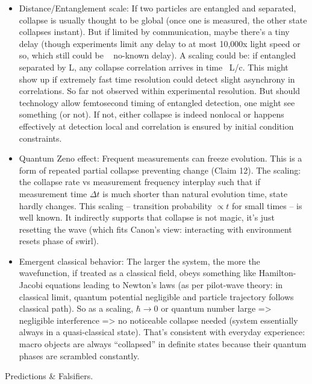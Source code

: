 \documentclass[11pt]{article}
\begin{document}
\begin{itemize}
\item 
Distance/Entanglement scale: If two particles are entangled and separated, collapse is usually thought to be global (once one is measured, the other state collapses instant). But if limited by communication, maybe there’s a tiny delay (though experiments limit any delay to at most 10,000x light speed or so, which still could be ~ no-known delay). A scaling could be: if entangled separated by L, any collapse correlation arrives in time ~L/c. This might show up if extremely fast time resolution could detect slight asynchrony in correlations. So far not observed within experimental resolution. But should technology allow femtosecond timing of entangled detection, one might see something (or not). If not, either collapse is indeed nonlocal or happens effectively at detection local and correlation is ensured by initial condition constraints.




\item 
Quantum Zeno effect: Frequent measurements can freeze evolution. This is a form of repeated partial collapse preventing change (Claim 12). The scaling: the collapse rate vs measurement frequency interplay such that if measurement time $\Delta t$ is much shorter than natural evolution time, state hardly changes. This scaling – transition probability $\propto t$ for small times – is well known. It indirectly supports that collapse is not magic, it's just resetting the wave (which fits Canon’s view: interacting with environment resets phase of swirl).




\item 
Emergent classical behavior: The larger the system, the more the wavefunction, if treated as a classical field, obeys something like Hamilton-Jacobi equations leading to Newton’s laws (as per pilot-wave theory: in classical limit, quantum potential negligible and particle trajectory follows classical path). So as a scaling, $\hbar \to 0$ or quantum number large => negligible interference => no noticeable collapse needed (system essentially always in a quasi-classical state). That’s consistent with everyday experience: macro objects are always “collapsed” in definite states because their quantum phases are scrambled constantly.




\end{itemize}

Predictions & Falsifiers.
\end{document}
